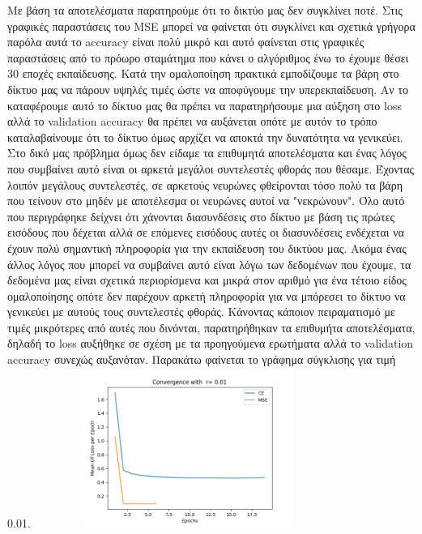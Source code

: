\documentclass[12pt,a4paper]{article}
\newcommand{\tl}{\textlatin}
\begin{document}
        Με βάση τα αποτελέσματα παρατηρούμε ότι το δικτύο μας δεν συγκλίνει ποτέ. Στις γραφικές παραστάσεις του \tl{MSE} μπορεί να φαίνεται ότι συγκλίνει και σχετικά γρήγορα παρόλα αυτά το \tl{accuracy} είναι πολύ μικρό και αυτό φαίνεται στις γραφικές παραστάσεις από το πρόωρο σταμάτημα που κάνει ο αλγόριθμος ένω το έχουμε θέσει 30 εποχές εκπαίδευσης. Κατά την ομαλοποίηση πρακτικά εμποδίζουμε τα βάρη στο δίκτυο μας να πάρουν υψηλές τιμές ώστε να αποφύγουμε την υπερεκπαίδευση. Αν το καταφέρουμε αυτό το δίκτυο μας θα πρέπει να παρατηρήσουμε μια αύξηση στο \tl{loss} αλλά το \tl{validation accuracy}  θα πρέπει να αυξάνεται οπότε με αυτόν το τρόπο καταλαβαίνουμε ότι το δίκτυο όμως αρχίζει να αποκτά την δυνατότητα να γενικεύει. Στο δικό μας πρόβλημα όμως δεν είδαμε τα επιθυμητά αποτελέσματα και ένας λόγος που συμβαίνει αυτό είναι οι αρκετά μεγάλοι συντελεστές φθοράς που θέσαμε. Έχοντας λοιπόν μεγάλους συντελεστές, σε αρκετούς νευρώνες φθείρονται τόσο πολύ τα βάρη που τείνουν στο μηδέν με αποτέλεσμα οι νευρώνες αυτοί να "νεκρώνουν". Όλο αυτό που περιγράφηκε δείχνει ότι χάνονται διασυνδέσεις στο δίκτυο με βάση τις πρώτες εισόδους που δέχεται αλλά σε επόμενες εισόδους αυτές οι διασυνδέσεις ενδέχεται να έχουν πολύ σημαντική πληροφορία για την εκπαίδευση του δικτύου μας. Ακόμα ένας άλλος λόγος που μπορεί να συμβαίνει αυτό είναι λόγω των δεδομένων που έχουμε, τα δεδομένα μας είναι σχετικά περιορίσμενα και μικρά στον αριθμό για ένα τέτοιο είδος ομαλοποίησης οπότε δεν παρέχουν αρκετή πληροφορία για να μπόρεσει το δίκτυο να γενικεύει με αυτούς τους συντελεστές φθοράς.
        Κάνοντας κάποιον πειραματισμό με τιμές μικρότερες από αυτές που δινόνται, παρατηρήθηκαν τα επιθυμήτα αποτελέσματα, δηλαδή το \tl{loss} αυξήθηκε σε σχέση με τα προηγούμενα ερωτήματα αλλά το \tl{validation accuracy} συνεχώς αυξανόταν. Παρακάτω φαίνεται το γράφημα σύγκλισης για τιμή 0.01.  
                   \includegraphics[width=10cm,height=5.2cm,left]{images/0.01.png}
\end{document}
